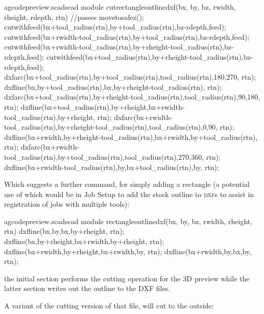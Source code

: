 \documentclass{ltxdoc}
\begin{document}
\lstset{firstnumber=\thegcpscad}
\begin{writecode}{a}{gcodepreview.scad}{scad}
module cutrectangleoutlinedxf(bx, by, bz, rwidth, rheight, rdepth, rtn) {//passes
  movetosafez();
  cutwithfeed(bx+tool_radius(rtn),by+tool_radius(rtn),bz-rdepth,feed);
  cutwithfeed(bx+rwidth-tool_radius(rtn),by+tool_radius(rtn),bz-rdepth,feed);
  cutwithfeed(bx+rwidth-tool_radius(rtn),by+rheight-tool_radius(rtn),bz-rdepth,feed);
  cutwithfeed(bx+tool_radius(rtn),by+rheight-tool_radius(rtn),bz-rdepth,feed);
  dxfarc(bx+tool_radius(rtn),by+tool_radius(rtn),tool_radius(rtn),180,270, rtn);
  dxfline(bx,by+tool_radius(rtn),bx,by+rheight-tool_radius(rtn), rtn);
  dxfarc(bx+tool_radius(rtn),by+rheight-tool_radius(rtn),tool_radius(rtn),90,180, rtn);
  dxfline(bx+tool_radius(rtn),by+rheight,bx+rwidth-tool_radius(rtn),by+rheight, rtn);
  dxfarc(bx+rwidth-tool_radius(rtn),by+rheight-tool_radius(rtn),tool_radius(rtn),0,90, rtn);
  dxfline(bx+rwidth,by+rheight-tool_radius(rtn),bx+rwidth,by+tool_radius(rtn), rtn);
  dxfarc(bx+rwidth-tool_radius(rtn),by+tool_radius(rtn),tool_radius(rtn),270,360, rtn);
  dxfline(bx+rwidth-tool_radius(rtn),by,bx+tool_radius(rtn),by, rtn);
}

\end{writecode}
\addtocounter{gcpscad}{16}

Which suggests a further command,  for simply adding a rectangle (a potential use of which would be in Job Setup to add the stock outline to \textsc{dxf}s to assist in registration of jobs with multiple tools):

\lstset{firstnumber=\thegcpscad}
\begin{writecode}{a}{gcodepreview.scad}{scad}
module rectangleoutlinedxf(bx, by, bz, rwidth, rheight, rtn) {
  dxfline(bx,by,bx,by+rheight, rtn);
  dxfline(bx,by+rheight,bx+rwidth,by+rheight, rtn);
  dxfline(bx+rwidth,by+rheight,bx+rwidth,by, rtn);
  dxfline(bx+rwidth,by,bx,by, rtn);
}

\end{writecode}
\addtocounter{gcpscad}{7}

\noindent the initial section performs the cutting operation for the 3D preview while the latter section writes out the outline to the DXF files.

A variant of the  cutting version of that file,  will cut to the outside:
\end{document}
